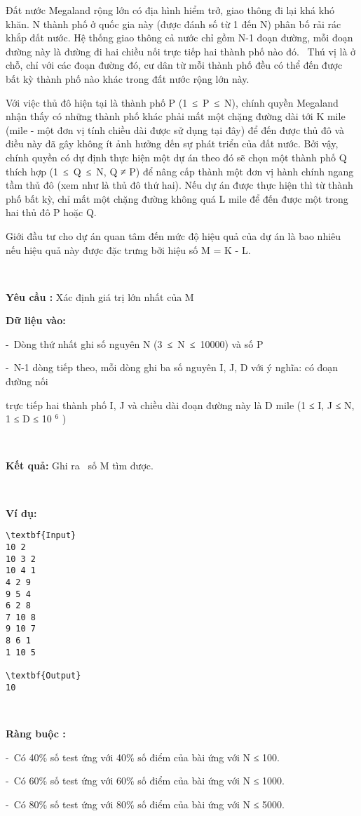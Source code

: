 

Đất nước Megaland rộng lớn có địa hình hiểm trở, giao thông đi lại khá khó khăn. N thành phố ở quốc gia này (được đánh số từ 1 đến N) phân bố rải rác khắp đất nước. Hệ thống giao thông cả nước chỉ gồm N-1 đoạn đường, mỗi đoạn đường này là đường đi hai chiều nối trực tiếp hai thành phố nào đó.  Thú vị là ở chỗ, chỉ với các đoạn đường đó, cư dân từ mỗi thành phố đều có thể đến được bất kỳ thành phố nào khác trong đất nước rộng lớn này.

Với việc thủ đô hiện tại là thành phố P (1 ≤ P ≤ N), chính quyền Megaland nhận thấy có những thành phố khác phải mất một chặng đường dài tới K mile (mile - một đơn vị tính chiều dài được sử dụng tại đây) để đến được thủ đô và điều này đã gây không ít ảnh hưởng đến sự phát triển của đất nước. Bởi vậy, chính quyền có dự định thực hiện một dự án theo đó sẽ chọn một thành phố Q thích hợp (1 ≤ Q ≤ N, Q ≠ P) để nâng cấp thành một đơn vị hành chính ngang tầm thủ đô (xem như là thủ đô thứ hai). Nếu dự án được thực hiện thì từ thành phố bất kỳ, chỉ mất một chặng đường không quá L mile để đến được một trong hai thủ đô P hoặc Q.

Giới đầu tư cho dự án quan tâm đến mức độ hiệu quả của dự án là bao nhiêu nếu hiệu quả này được đặc trưng bởi hiệu số M = K - L.

 

\textbf{Yêu cầu : } Xác định giá trị lớn nhất của M

\textbf{Dữ liệu vào: }

- Dòng thứ nhất ghi số nguyên N (3 ≤ N ≤ 10000) và số P

- N-1 dòng tiếp theo, mỗi dòng ghi ba số nguyên I, J, D với ý nghĩa: có đoạn đường nối

trực tiếp hai thành phố I, J và chiều dài đoạn đường này là D mile (1 ≤ I, J ≤ N, 1 ≤ D ≤ 10 $^ 6 $ )

 

\textbf{Kết quả: } Ghi ra  số M tìm được.

 

\textbf{Ví dụ: }
\begin{verbatim}
\textbf{Input}
10 2
10 3 2
10 4 1
4 2 9
9 5 4
6 2 8
7 10 8
9 10 7
8 6 1
1 10 5

\textbf{Output}
10\end{verbatim}

 

\textbf{Ràng buộc : }

- Có 40\% số test ứng với 40\% số điểm của bài ứng với N ≤ 100.

- Có 60\% số test ứng với 60\% số điểm của bài ứng với N ≤ 1000.

- Có 80\% số test ứng với 80\% số điểm của bài ứng với N ≤ 5000.

 